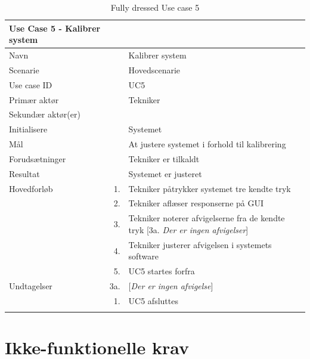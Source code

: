 
\begin{longtabu} to 
\toprule
    {\large \textbf{Use Case 5 - Kalibrer system}} && \\
    \toprule
    Navn &&    Kalibrer system\\
    Scenarie &&    Hovedscenarie\\
    Use case ID &&    UC5\\
    Primær aktør &&    Tekniker\\
    Sekundær aktør(er) &&    \\
    Initialisere &&    Systemet\\
    Mål &&    At justere systemet i forhold til kalibrering\\
    Forudsætninger &&    Tekniker er tilkaldt\\
    Resultat &&    Systemet er justeret\\
    \toprule
    Hovedforløb &    1. &    Tekniker påtrykker systemet tre kendte tryk\\[-1ex]
                &    2. &   Tekniker aflæser responserne på GUI\\[-1ex]
                &    3. &    Tekniker noterer afvigelserne fra de kendte tryk\newline
                             [3a. \textit{Der er ingen afvigelser}]\\[-1ex]
                &    4. &   Tekniker justerer afvigelsen i systemets software\\[-1ex]
               &	5.	&	UC5 startes forfra\\[-1ex]
    \toprule
    Undtagelser &    3a. &    [\textit{Der er ingen afvigelse}]\\[-1ex]
    &	1.	&	UC5 afsluttes\\
                \toprule
\caption{Fully dressed Use case 5}
\label{UC5}
\end{longtabu}
\newpage


\section{Ikke-funktionelle krav}

